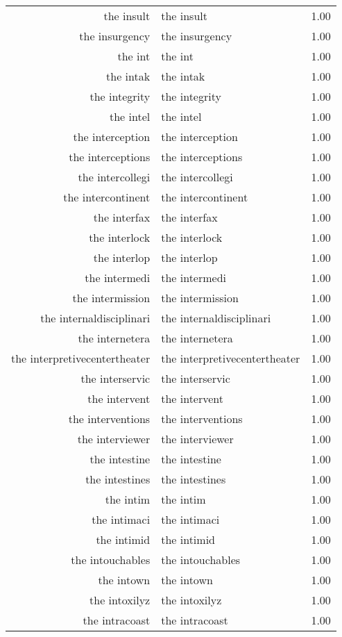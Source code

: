 \begin{table}[ht]
\begin{tabular}{rlr}
  the insult & the insult & 1.00 \\ 
  the insurgency & the insurgency & 1.00 \\ 
  the int & the int & 1.00 \\ 
  the intak & the intak & 1.00 \\ 
  the integrity & the integrity & 1.00 \\ 
  the intel & the intel & 1.00 \\ 
  the interception & the interception & 1.00 \\ 
  the interceptions & the interceptions & 1.00 \\ 
  the intercollegi & the intercollegi & 1.00 \\ 
  the intercontinent & the intercontinent & 1.00 \\ 
  the interfax & the interfax & 1.00 \\ 
  the interlock & the interlock & 1.00 \\ 
  the interlop & the interlop & 1.00 \\ 
  the intermedi & the intermedi & 1.00 \\ 
  the intermission & the intermission & 1.00 \\ 
  the internaldisciplinari & the internaldisciplinari & 1.00 \\ 
  the internetera & the internetera & 1.00 \\ 
  the interpretivecentertheater & the interpretivecentertheater & 1.00 \\ 
  the interservic & the interservic & 1.00 \\ 
  the intervent & the intervent & 1.00 \\ 
  the interventions & the interventions & 1.00 \\ 
  the interviewer & the interviewer & 1.00 \\ 
  the intestine & the intestine & 1.00 \\ 
  the intestines & the intestines & 1.00 \\ 
  the intim & the intim & 1.00 \\ 
  the intimaci & the intimaci & 1.00 \\ 
  the intimid & the intimid & 1.00 \\ 
  the intouchables & the intouchables & 1.00 \\ 
  the intown & the intown & 1.00 \\ 
  the intoxilyz & the intoxilyz & 1.00 \\ 
  the intracoast & the intracoast & 1.00 \\ 

\end{tabular}
\end{table}
